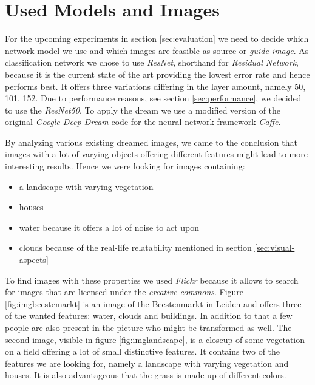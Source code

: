 \section{Used Models and Images}
\label{sec:data}
For the upcoming experiments in section \ref{sec:evaluation} we need to decide which network model we use and which images are feasible as source or \emph{guide image}.
As classification network we chose to use \emph{ResNet}\cite{he2016deep}, shorthand for \emph{Residual Network}, because it is the current state of the art providing the lowest error rate and hence performs best.\cite{cnnComparison}
It offers three variations differing in the layer amount, namely 50, 101, 152.
Due to performance reasons, see section \ref{sec:performance}, we decided to use the \emph{ResNet50}.
To apply the dream we use a modified version of the original \textit{Google Deep Dream} code\cite{deep-dream-github} for the neural network framework \textit{Caffe}\cite{jia2014caffe}.

By analyzing various existing dreamed images, we came to the conclusion that images with a lot of varying objects offering different features might lead to more interesting results.
Hence we were looking for images containing: 
\begin{itemize}
	\item a landscape with varying vegetation
	\item houses
	\item water because it offers a lot of noise to act upon
	\item clouds because of the real-life relatability mentioned in section \ref{sec:visual-aspects}
\end{itemize}

To find images with these properties we used \emph{Flickr} because it allows to search for images that are licensed under the \emph{creative commons}.
Figure \ref{fig:imgbeestemarkt} is an image of the Beestenmarkt in Leiden and offers three of the wanted features: water, clouds and buildings.
In addition to that a few people are also present in the picture who might be transformed as well.
The second image, visible in figure \ref{fig:imglandscape}, is a closeup of some vegetation on a field offering a lot of small distinctive features.
It contains two of the features we are looking for, namely a landscape with varying vegetation and houses.
It is also advantageous that the grass is made up of different colors.




